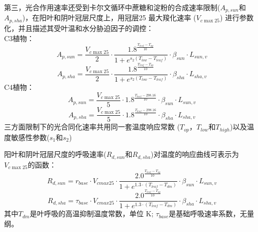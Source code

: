 第三，光合作用速率还受到卡尔文循环中蔗糖和淀粉的合成速率限制($A_{p,sun}$和$A_{p,sha}$)，在阳叶和阴叶冠层尺度上，用冠层25 \textcelsius 最大羧化速率 ($V_{c \max25}$) 进行参数化，并且描述其受叶温和水分胁迫因子的调控：\\
C3植物：\\
\begin{equation}\label{A_e_a_sun}
A_{p,sun}=\frac{V_{c \max 25}}{2} \cdot \frac{1.8^{\frac{T_{{leaf }}-T_{o p}}{10}}}{1+e^{s_{2}\left(T_{{low }}-T_{{leaf }}\right)}} \cdot \beta_{sun} \cdot L_{sun,v}
\end{equation}
\begin{equation}\label{A_e_a_sha}
A_{p,sha}=\frac{V_{c \max 25}}{2} \cdot \frac{1.8^{\frac{T_{{leaf }}-T_{o p}}{10}}}{1+e^{s_{2}\left(T_{{low }}-T_{{leaf }}\right)}} \cdot \beta_{sha} \cdot L_{sha,v}
\end{equation}
C4植物：\\
\begin{equation}\label{A_e_b_sun}
A_{p,sun}=\frac{V_{c \max 25}}{5} \cdot 1.8^{\frac{T_{{leaf }}-298.16}{10}} \cdot \beta_{sun} \cdot L_{sun,v}
\end{equation}
\begin{equation}\label{A_e_b_sha}
A_{p,sha}=\frac{V_{c \max 25}}{5} \cdot 1.8^{\frac{T_{{leaf }}-298.16}{10}} \cdot \beta_{sha} \cdot L_{sha,v}
\end{equation}
三方面限制下的光合同化速率共用同一套温度响应常数 ($T_{op}$，$T_{low}$和$T_{high}$)以及温度敏感性参数($s_1$和$s_2$)


阳叶和阴叶冠层尺度的呼吸速率($R_{d,sun}$和$R_{d,sha}$)对温度的响应曲线可表示为$V_{c \max25}$的函数：
\begin{equation}\label{R_d1_sun}
R_{d,sun}=r_{{base }} \cdot V_{cmax 25} \cdot \frac{2.0^{\frac{T_{leaf}-T_{op}}{10}}}{1+e^{1.3 \cdot\left(T_{leaf}-T_{d m}\right)}} \cdot \beta_{sun} \cdot L_{sun,v}
\end{equation}
\begin{equation}\label{R_d1_sha}
R_{d,sha}=\tau_{{base }} \cdot V_{cmax 25} \cdot \frac{2.0^{\frac{T_{leaf}-T_{op}}{10}}}{1+e^{1.3 \cdot\left(T_{leaf}-T_{d m}\right)}} \cdot \beta_{sha} \cdot L_{sha,v}
\end{equation}
其中$T_{dm}$是叶呼吸的高温抑制温度常数，单位 K; $\tau_{base}$是基础呼吸速率系数，无量纲。


